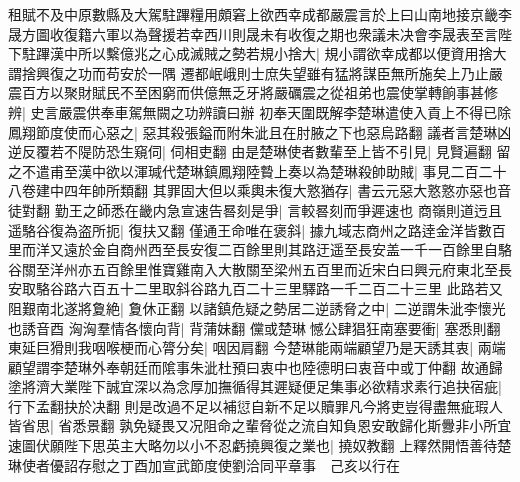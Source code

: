 租賦不及中原數縣及大駕駐蹕糧用頗窘上欲西幸成都嚴震言於上曰山南地接京畿李晟方圖收復籍六軍以為聲援若幸西川則晟未有收復之期也衆議未决會李晟表至言陛下駐蹕漢中所以繫億兆之心成滅賊之勢若規小捨大|{
	規小謂欲幸成都以便資用捨大謂捨興復之功而苟安於一隅}
遷都岷峨則士庶失望雖有猛將謀臣無所施矣上乃止嚴震百方以聚財賦民不至困窮而供億無乏牙將嚴礪震之從祖弟也震使掌轉餉事甚修辨|{
	史言嚴震供奉車駕無闕之功辨讀曰辦}
初奉天圍既解李楚琳遣使入貢上不得已除鳳翔節度使而心惡之|{
	惡其殺張鎰而附朱泚且在肘腋之下也惡烏路翻}
議者言楚琳凶逆反覆若不隄防恐生窺伺|{
	伺相吏翻}
由是楚琳使者數輩至上皆不引見|{
	見賢遍翻}
留之不遣甫至漢中欲以渾瑊代楚琳鎮鳳翔陸䞇上奏以為楚琳殺帥助賊|{
	事見二百二十八卷建中四年帥所類翻}
其罪固大但以乘輿未復大憝猶存|{
	書云元惡大憝憝亦惡也音徒對翻}
勤王之師悉在畿内急宣速告晷刻是爭|{
	言較晷刻而爭遲速也}
商嶺則道迃且遥駱谷復為盗所扼|{
	復扶又翻}
僅通王命唯在褒斜|{
	據九域志商州之路逹金洋皆數百里而洋又遠於金自商州西至長安復二百餘里則其路迂遥至長安盖一千一百餘里自駱谷關至洋州亦五百餘里惟寶雞南入大散關至梁州五百里而近宋白曰興元府東北至長安取駱谷路六百五十二里取斜谷路九百二十三里驛路一千二百二十三里}
此路若又阻艱南北遂將夐絶|{
	夐休正翻}
以諸鎮危疑之勢居二逆誘脅之中|{
	二逆謂朱泚李懷光也誘音酉}
洶洶羣情各懷向背|{
	背蒲妹翻}
儻或楚琳憾公肆猖狂南塞要衝|{
	塞悉則翻}
東延巨猾則我咽喉梗而心膂分矣|{
	咽因肩翻}
今楚琳能兩端顧望乃是天誘其衷|{
	兩端顧望謂李楚琳外奉朝廷而隂事朱泚杜預曰衷中也陸德明曰衷音中或丁仲翻}
故通歸塗將濟大業陛下誠宜深以為念厚加撫循得其遲疑便足集事必欲精求素行追抉宿疵|{
	行下孟翻抉於决翻}
則是改過不足以補愆自新不足以贖罪凡今將吏豈得盡無疵瑕人皆省思|{
	省悉景翻}
孰免疑畏又况阻命之輩脅從之流自知負恩安敢歸化斯釁非小所宜速圖伏願陛下思英主大略勿以小不忍虧撓興復之業也|{
	撓奴教翻}
上釋然開悟善待楚琳使者優詔存慰之丁酉加宣武節度使劉洽同平章事　己亥以行在

